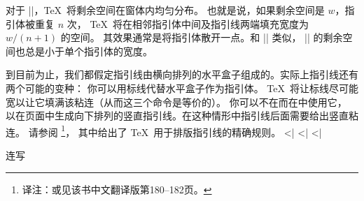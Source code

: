 {%
\li 对于 |\xleaders|，\TeX\ 将剩余空间在窗体内均匀分布。
也就是说，如果剩余空间是 $w$，指引体被重复 $n$ 次，
\TeX\ 将在相邻指引体中间及指引线两端填充宽度为 $w/(n+1)$ 的空间。
其效果通常是将指引体散开一点。和 |\cleaders| 类似，
|\xleaders| 的剩余空间也总是小于单个指引体的宽度。
\endulist

到目前为止，我们都假定指引线由横向排列的水平盒子组成的。实际上指引线还有两个可能的变种：
\olist
\li 你可以用标线代替水平盒子作为指引体。
\TeX\ 将让标线尽可能宽以让它填满该粘连（从而这三个命令是等价的）。
\li 你可以不在而在中使用它，
以在页面中生成向下排列的竖直指引线。在这种情形中指引线后面需要给出竖直粘连。
\endolist
\noindent
请参阅 
\footnote{译注：或见该书中文翻译版第180--182页。}，
其中给出了 \TeX\ 用于排版指引线的精确规则。
\eix^^|\leaders|
\eix^^|\cleaders|
\eix^^|\xleaders|
\endconcept


\concept 连写

}
